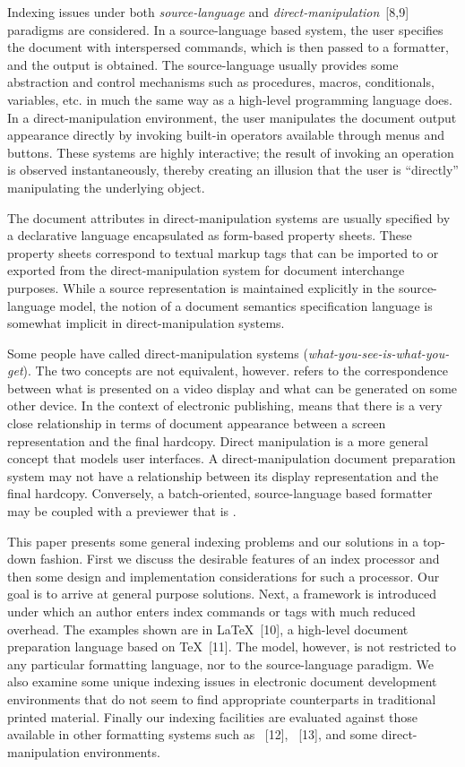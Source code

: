 Indexing issues under both {\it source-language\/} and
{\it direct-manipulation\/}~[8,9] paradigms are considered.
In a source-language based system, the user specifies
the document with interspersed commands, which is then passed to a formatter,
and the output is obtained.  The source-language usually provides some
abstraction and control mechanisms such as procedures, macros,
conditionals, variables, etc. in much the same way as a high-level programming
language does.  In a direct-manipulation environment,
the user manipulates the document output appearance directly
by invoking built-in operators available through menus and buttons.
These systems are highly interactive; the result of invoking an operation
is observed instantaneously, thereby creating an illusion that the user
is ``directly'' manipulating the underlying object.

The document attributes in direct-manipulation systems
are usually specified by a declarative language encapsulated as
form-based property sheets.  These property sheets
correspond to textual markup tags that can be imported to
or exported from the direct-manipulation system for document interchange
purposes.  While a source representation is maintained explicitly in the
source-language model, the notion of a document semantics specification
language is somewhat implicit in direct-manipulation systems.

Some people have called direct-manipulation systems {\W}
({\it what-you-see-is-what-you-get\/}).
The two concepts are not equivalent, however.
{\W} refers to the correspondence between what is presented on a video display
and what can be generated on some other device.  In the context of
electronic publishing, {\W} means that there is a very close relationship
in terms of document appearance
between a screen representation and the final hardcopy.
Direct manipulation is a more general concept that models user interfaces.
A direct-manipulation document preparation system may not have
a {\W} relationship between its display representation and the final hardcopy.
Conversely, a batch-oriented, source-language based formatter
may be coupled with a previewer that is {\W}.

This paper presents some general indexing problems and our solutions
in a top-down fashion.
First we discuss the desirable features of an index processor
and then some design and implementation considerations for such a processor.
Our goal is to arrive at general purpose solutions.
Next, a framework is introduced under which an author enters index commands
or tags with much reduced overhead.
The examples shown are in {\LaTeX}~[10], a high-level
document preparation language based on {\TeX}~[11].
The model, however, is not restricted to any particular formatting language,
nor to the source-language paradigm.
We also examine some unique indexing issues in
electronic document development environments that do not seem to find
appropriate counterparts in traditional printed material.
Finally our indexing facilities are evaluated against those available in
other formatting systems such as {\SB}~[12],
{\TF}~[13], and some direct-manipulation environments.

